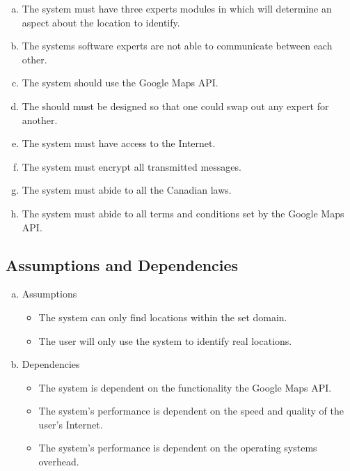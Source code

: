 \documentclass[titlepage]{article}
\begin{document}
		\begin{enumerate}[a)]
			\item The system must have three experts modules in which will determine an aspect about the location to identify.
			\item The systems software experts are not able to communicate between each other.
			\item The system should use the Google Maps API.
			\item The should must be designed so that one could swap out any expert for another.
			\item The system must have access to the Internet.
			\item The system must encrypt all transmitted messages.
			\item The system must abide to all the Canadian laws.
			\item The system must abide to all terms and conditions set by the Google Maps API.
			
		\end{enumerate}
		
		\subsection{Assumptions and Dependencies}
		\label{sub:assumptions_and_dependencies}
		\begin{enumerate}[a)]
			\item Assumptions
			\begin{itemize}
				\item The system can only find locations within the set domain.
				\item The user will only use the system to identify real locations.
				
			\end{itemize}
			\item Dependencies
			
			\begin{itemize}
				\item The system is dependent on the functionality the Google Maps API.
				\item The system's performance is dependent on the speed and quality of the user's Internet.
				\item The system's performance is dependent on the operating systems overhead.
				
			\end{itemize}
		\end{enumerate}
		
\end{document}
